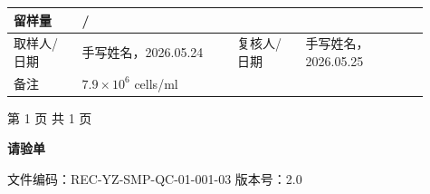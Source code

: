 \documentclass[UTF8,10pt,a4paper,fontset=fandol]{ctexart}
\newcommand{\fieldvalue}[1]{#1}
\newcommand{\handwritten}[1]{#1}
\begin{document}
\begin{tabular}{|p{0.15\linewidth}|p{0.34\linewidth}|p{0.15\linewidth}|p{0.27\linewidth}|}
留样量 &
\fieldvalue{/} &
\multicolumn{2}{l|}{}
\\ \hline

取样人/日期 &
\multicolumn{1}{l|}{
\fieldvalue{\handwritten{手写姓名，2026.05.24}}
} &
复核人/日期 &
\fieldvalue{\handwritten{手写姓名，2026.05.25}}
\\ \hline

备注 &
\multicolumn{3}{l|}{
\fieldvalue{\handwritten{$7.9 \times 10^{6}$ cells/ml}}
}
\\ \hline
\end{tabular}

\normalsize
\begin{center}
第 1 页 共 1 页
\end{center}

\newpage

\begin{center}
\textbf{\Large 请验单}
\end{center}

\noindent
文件编码：REC-YZ-SMP-QC-01-001-03 \hfill 版本号：2.0

\medskip
\end{document}
